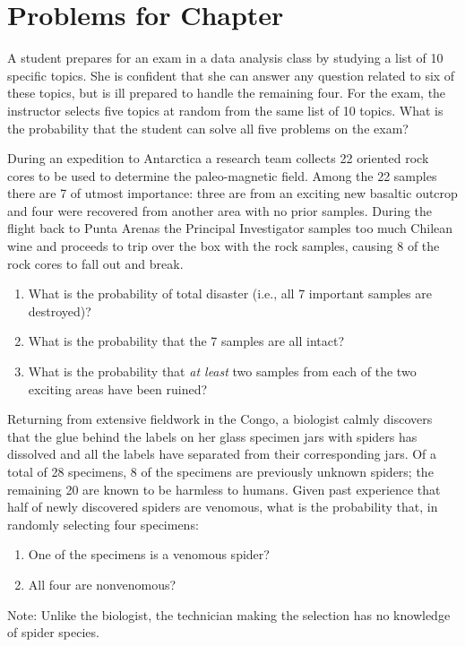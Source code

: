 \clearpage
\section{Problems for Chapter \thechapter}

\begin{problem}
A student prepares for an exam in a data analysis class by studying a list of 10 specific topics.  She is
confident that she can answer any question related to six of these topics, but is ill prepared to handle the
remaining four.  For the exam, the instructor selects five topics at random from the same list of 10 topics.
What is the probability that the student can solve all five problems on the exam?
\end{problem}

\begin{problem}
During an expedition to Antarctica a research team collects 22 oriented rock cores to be used to determine
the paleo-magnetic field.  Among the 22 samples there are 7 of utmost importance: three are from an exciting new
basaltic outcrop and four were recovered from another area with no prior samples.  During the flight back to Punta Arenas
the Principal Investigator samples too much Chilean wine and proceeds to trip over the box with the rock samples,
causing 8 of the rock cores to fall out and break.
\begin{enumerate}[label=\alph*)]
\item What is the probability of total disaster (i.e., all 7 important samples are destroyed)?
\item What is the probability that the 7 samples are all intact?
\item What is the probability that \emph{at least} two samples from each of the two exciting areas have been ruined?
\end{enumerate}
\end{problem}

\begin{problem}
Returning from extensive fieldwork
in the Congo, a biologist calmly discovers that the glue behind the
labels on her glass specimen jars with spiders has dissolved and all the labels have
separated from their corresponding jars.  Of a total of 28 specimens, 8 of the specimens
are previously unknown spiders; the remaining 20 are known to be harmless to humans.  Given past
experience that half of newly discovered spiders are venomous,
what is the probability that, in randomly selecting four specimens:
\begin{enumerate}[label=\alph*)]
\item One of the specimens is a venomous spider?
\item All four are nonvenomous?
\end{enumerate}
Note: Unlike the biologist, the technician
making the selection has no knowledge of spider species.
\end{problem}

